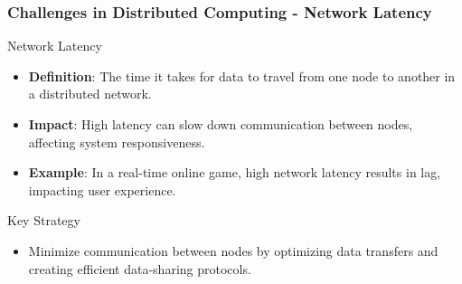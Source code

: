 \documentclass[aspectratio=169]{beamer}
\begin{document}
\begin{frame}[fragile]
  \frametitle{Challenges in Distributed Computing - Network Latency}
  \begin{block}{Network Latency}
    \begin{itemize}
      \item \textbf{Definition}: The time it takes for data to travel from one node to another in a distributed network.
      \item \textbf{Impact}: High latency can slow down communication between nodes, affecting system responsiveness.
      \item \textbf{Example}: In a real-time online game, high network latency results in lag, impacting user experience.
    \end{itemize}
  \end{block}

  \begin{block}{Key Strategy}
    \begin{itemize}
      \item Minimize communication between nodes by optimizing data transfers and creating efficient data-sharing protocols.
    \end{itemize}
  \end{block}
\end{frame}
\end{document}
